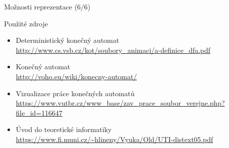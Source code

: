 \documentclass[hyperref={unicode}]{beamer}
\begin{document}
\begin{frame}{Možnosti reprezentace (6/6)}
\begin{center}
\end{center}
\end{frame}

\begin{frame}[t]{Použité zdroje}
\begin{itemize}
        \setlength\itemsep{1em}
        \item Deterministický konečný automat\\
        {\footnotesize \url{http://www.cs.vsb.cz/kot/soubory_animaci/a-definice_dfa.pdf}}
        \item Konečný automat\\
        {\footnotesize \url{http://voho.eu/wiki/konecny-automat/}}
        \item Vizualizace práce konečných automatů\\
        {\footnotesize \url{https://www.vutbr.cz/www_base/zav_prace_soubor_verejne.php?file_id=116647}}
        \item Úvod do teoretické informatiky\\
        {\footnotesize \url{https://www.fi.muni.cz/~hlineny/Vyuka/Old/UTI-distext05.pdf}}
\end{itemize}
\end{frame}
\end{document}
